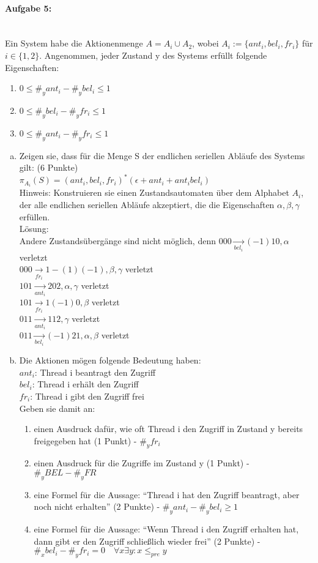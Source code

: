 \documentclass[a4paper,12pt]{scrartcl}
\begin{document}
 \paragraph{Aufgabe 5:}\quad\\
 Ein System habe die Aktionenmenge $A=A_i\cup A_2$, wobei $A_i:=\{ant_i,bel_i,fr_i\}$ für $i\in\{1,2\}$. Angenommen, jeder Zustand y des Systems erfüllt folgende Eigenschaften:
 \begin{enumerate}
  \item $0\leq\#_y ant_i-\#_y bel_i \leq 1$
  \item $0\leq\#_y bel_i-\#_y fr_i \leq 1$
  \item $0\leq\#_y ant_i-\#_y fr_i \leq 1$
 \end{enumerate}
 \begin{enumerate}[(a)]
  \item Zeigen sie, dass für die Menge S der endlichen seriellen Abläufe des Systems gilt: (6 Punkte)\\
  $\pi_{A_i}(S)=(ant_i,bel_i,fr_i)^* (\epsilon+ant_i+ant_i bel_i)$\\
  Hinweis: Konstruieren sie einen Zustandsautomaten über dem Alphabet $A_i$, der alle endlichen seriellen Abläufe akzeptiert, die die Eigenschaften $\alpha,\beta,\gamma$ erfüllen.\\
  Lösung:\\ %
  Andere Zustandsübergänge sind nicht möglich, denn
  $000\underset{bel_i}{\to}(-1)10, \alpha$ verletzt\\
  $000\underset{fr_i}{\to}1-(1)(-1), \beta,\gamma$ verletzt\\
  $101\underset{ant_i}{\to}202, \alpha,\gamma$ verletzt\\
  $101\underset{fr_i}{\to}1(-1)0, \beta$ verletzt\\
  $011\underset{ant_i}{\to}112, \gamma$ verletzt\\
  $011\underset{bel_i}{\to}(-1)21, \alpha,\beta$ verletzt\\
  
  \item Die Aktionen mögen folgende Bedeutung haben:\\
  $ant_i$: Thread i beantragt den Zugriff\\
  $bel_i$: Thread i erhält den Zugriff\\
  $fr_i$: Thread i gibt den Zugriff frei\\
  Geben sie damit an:
  \begin{enumerate}
   \item einen Ausdruck dafür, wie oft Thread i den Zugriff in Zustand y bereits freigegeben hat (1 Punkt) - $\#_y fr_i$
   \item einen Ausdruck für die Zugriffe im Zustand y (1 Punkt) - $\#_y BEL - \#_y FR$
   \item eine Formel für die Aussage: "`Thread i hat den Zugriff beantragt, aber noch nicht erhalten"' (2 Punkte) - $\#_y ant_i - \#_y bel_i \geq 1$
   \item eine Formel für die Aussage: "`Wenn Thread i den Zugriff erhalten hat, dann gibt er den Zugriff schließlich wieder frei"' (2 Punkte) - $\#_x bel_i - \#_y fr_i = 0\quad \forall x\exists y:x\leq_{pre}y$
  \end{enumerate}


\end{enumerate}
\end{document}
